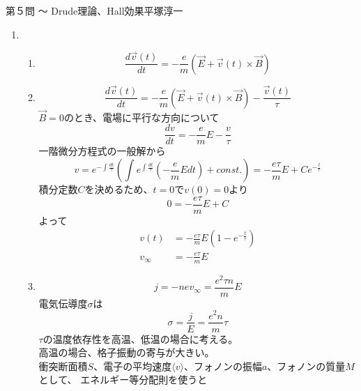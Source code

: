 \begin{answer}{第５問 〜 Drude理論、Hall効果}{平塚淳一}
\begin{enumerate}
\def\<{\langle}
\def\>{\rangle}
\def\kB{k_{\mathrm B}}
\item 
  \begin{enumerate}
  \item 
    \begin{equation}
    \frac{d \overrightarrow{v}(t)}{dt}
    =-\frac{e}{m}(\overrightarrow{E}+\overrightarrow{v}(t)\times \overrightarrow{B})
    \end{equation}
  \item 
    \begin{equation}
    \frac{d \overrightarrow{v}(t)}{dt}
    =-\frac{e}{m}(\overrightarrow{E}+\overrightarrow{v}(t)\times \overrightarrow{B})
    -\frac{\overrightarrow{v}(t)}{\tau}
    \end{equation}
    $\overrightarrow{B}=0$のとき、電場に平行な方向について
    \begin{equation}
    \frac{dv}{dt}=-\frac{e}{m}E-\frac{v}{\tau}
    \end{equation}
    一階微分方程式の一般解から
    \begin{equation}
    v
    =e^{-\int\frac{dt}{\tau}}(\int e^{\int\frac{dt}{\tau}}(-\frac{e}{m}Edt)+const.)
    =-\frac{e\tau}{m}E +Ce^{-\frac{t}{\tau}}
    \end{equation}
    積分定数$C$を決めるため、$t=0$で$v(0)=0$より
    \begin{equation}
    0=-\frac{e\tau}{m}E+C
    \end{equation}
    よって
    \begin{align}
    v(t)&=-\frac{e\tau}{m}E(1-e^{-\frac{t}{\tau}})\\
    v_{\infty}&=-\frac{e\tau}{m}E
    \end{align}
  \item 
    \begin{equation}
    j=-nev_{\infty}=\frac{e^2\tau n}{m}E
    \end{equation}
    電気伝導度$\sigma$は
    \begin{equation}
    \sigma =\frac{j}{E}=\frac{e^2n}{m}\tau
    \end{equation}
    $\tau$の温度依存性を高温、低温の場合に考える。\\
    高温の場合、格子振動の寄与が大きい。\\
    衝突断面積$S$、電子の平均速度$\<v\>$、フォノンの振幅$a$、フォノンの質量$M$として、
    エネルギー等分配則を使うと
    \begin{align}

\end{align}
\end{enumerate}
\end{enumerate}
\end{answer}
